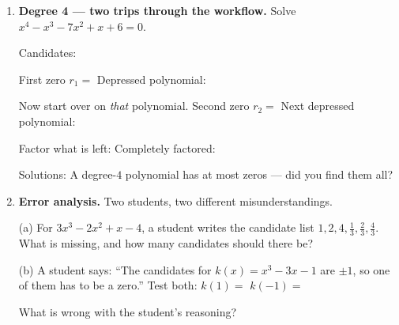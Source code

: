 \documentclass[10pt]{article}
\begin{document}
\begin{tcolorbox}[colback=white, colframe=black!40, title=\textbf{Tier A --- Approaching Proficiency},
    fonttitle=\bfseries, arc=1.5mm, left=3mm, right=3mm, top=2mm, bottom=2mm, breakable]
\begin{enumerate}[leftmargin=1.7em, itemsep=10pt]
    \vspace{2pt}
    (d) Test the one you think it is, then write $f$ completely factored: \blank{5.0cm}

    \vspace{2pt}
    (e) All three solutions: \blank{3.6cm} \; How many synthetic divisions did the graph save you?
    \blank{1.2cm}

  \item \textbf{Degree 4 --- two trips through the workflow.} Solve $x^4 - x^3 - 7x^2 + x + 6 = 0$.

    \vspace{2pt}
    Candidates: \blank{5.0cm}

    \vspace{2pt}
    First zero $r_1 = $ \blank{1.0cm} \; Depressed polynomial: \blank{3.4cm}

    \vspace{2pt}
    Now start over on \emph{that} polynomial. Second zero $r_2 = $ \blank{1.0cm} \;
    Next depressed polynomial: \blank{3.0cm}

    \vspace{2pt}
    Factor what is left: \blank{3.0cm} \quad Completely factored: \blank{5.0cm}

    \vspace{2pt}
    Solutions: \blank{4.0cm} \; A degree-$4$ polynomial has at most \blank{1.0cm} zeros --- did you
    find them all? \blank{1.0cm}

  \item \textbf{Error analysis.} Two students, two different misunderstandings.

    \vspace{2pt}
    (a) For $3x^3 - 2x^2 + x - 4$, a student writes the candidate list $1, 2, 4, \tfrac13, \tfrac23,
    \tfrac43$. What is missing, and how many candidates should there be? \blank{5.4cm}

    \vspace{2pt}
    (b) A student says: ``The candidates for $k(x) = x^3 - 3x - 1$ are $\pm 1$, so one of them has
    to be a zero.'' Test both: $k(1) = $ \blank{1.2cm} \quad $k(-1) = $ \blank{1.2cm}

    \vspace{2pt}
    What is wrong with the student's reasoning? \blank{6.0cm}
\end{enumerate}
\end{tcolorbox}
\end{document}
